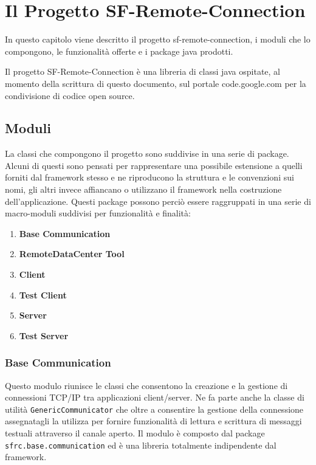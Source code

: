 
\chapter{Il Progetto SF-Remote-Connection}
\label{ch:sfremoteconnection}
In questo capitolo viene descritto il progetto sf-remote-connection, i moduli che lo compongono, le funzionalità offerte e i package java prodotti.

Il progetto SF-Remote-Connection è una libreria di classi java ospitate, al momento della scrittura di questo documento, sul portale %
code.google.com per la condivisione di codice open source.

\section{Moduli} 
\label{sec:moduli}
La classi che compongono il progetto sono suddivise in una serie di package. %
Alcuni di questi sono pensati per rappresentare una possibile estensione a quelli forniti dal framework stesso e ne riproducono la struttura e le convenzioni sui nomi, gli altri invece affiancano o utilizzano il framework nella costruzione dell'applicazione.
Questi package possono perciò essere raggruppati in una serie di macro-moduli suddivisi per funzionalità e finalità:
\begin{enumerate}
	\item \textbf{Base Communication}
	\item \textbf{RemoteDataCenter Tool}
	\item \textbf{Client}
	\item \textbf{Test Client}
	\item \textbf{Server}         
	\item \textbf{Test Server}
\end{enumerate}


\subsection{Base Communication}
\label{sub:basecommodule}
Questo modulo riunisce le classi che consentono la creazione e la gestione di connessioni TCP/IP tra applicazioni client/server. Ne fa parte anche la classe di utilità \texttt{GenericCommunicator} che oltre a consentire la gestione della connessione assegnatagli la utilizza per fornire funzionalità di lettura e scrittura di messaggi testuali attraverso il canale aperto.
Il modulo è composto dal package \texttt{sfrc.base.communication} ed è una libreria totalmente indipendente dal framework.

